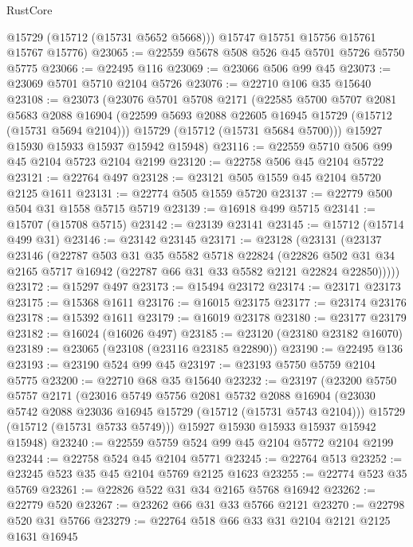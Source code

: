 \begin{lexlean}{RustCore}
\begin{coremodule}
        @15729
        (@15712 (@15731 @5652 @5668)))
      @15747
      @15751
      @15756
      @15761
      @15767
      @15776)
@23065 := @22559 @5678 @508 @526 @45 @5701 @5726 @5750 @5775
@23066 := @22495 @116
@23069 := @23066 @506 @99 @45
@23073 := @23069 @5701 @5710 @2104 @5726
@23076 := @22710 @106 @35 @15640
@23108 := @23073
    (@23076
      @5701
      @5708
      @2171
      (@22585
        @5700
        @5707
        @2081
        @5683
        @2088
        @16904
        (@22599 @5693 @2088 @22605 @16945 @15729 (@15712 (@15731 @5694 @2104)))
        @15729
        (@15712 (@15731 @5684 @5700)))
      @15927
      @15930
      @15933
      @15937
      @15942
      @15948)
@23116 := @22559 @5710 @506 @99 @45 @2104 @5723 @2104 @2199
@23120 := @22758 @506 @45 @2104 @5722
@23121 := @22764 @497
@23128 := @23121 @505 @1559 @45 @2104 @5720 @2125 @1611
@23131 := @22774 @505 @1559 @5720
@23137 := @22779 @500 @504 @31 @1558 @5715 @5719
@23139 := @16918 @499 @5715
@23141 := @15707 (@15708 @5715)
@23142 := @23139 @23141
@23145 := @15712 (@15714 @499 @31)
@23146 := @23142 @23145
@23171 := @23128
    (@23131
      (@23137
        @23146
        (@22787
          @503
          @31
          @35
          @5582
          @5718
          @22824
          (@22826 @502 @31 @34 @2165 @5717 @16942 (@22787 @66 @31 @33 @5582 @2121 @22824 @22850)))))
@23172 := @15297 @497
@23173 := @15494 @23172
@23174 := @23171 @23173
@23175 := @15368 @1611
@23176 := @16015 @23175
@23177 := @23174 @23176
@23178 := @15392 @1611
@23179 := @16019 @23178
@23180 := @23177 @23179
@23182 := @16024 (@16026 @497)
@23185 := @23120 (@23180 @23182 @16070)
@23189 := @23065 (@23108 (@23116 @23185 @22890))
@23190 := @22495 @136
@23193 := @23190 @524 @99 @45
@23197 := @23193 @5750 @5759 @2104 @5775
@23200 := @22710 @68 @35 @15640
@23232 := @23197
    (@23200
      @5750
      @5757
      @2171
      (@23016
        @5749
        @5756
        @2081
        @5732
        @2088
        @16904
        (@23030 @5742 @2088 @23036 @16945 @15729 (@15712 (@15731 @5743 @2104)))
        @15729
        (@15712 (@15731 @5733 @5749)))
      @15927
      @15930
      @15933
      @15937
      @15942
      @15948)
@23240 := @22559 @5759 @524 @99 @45 @2104 @5772 @2104 @2199
@23244 := @22758 @524 @45 @2104 @5771
@23245 := @22764 @513
@23252 := @23245 @523 @35 @45 @2104 @5769 @2125 @1623
@23255 := @22774 @523 @35 @5769
@23261 := @22826 @522 @31 @34 @2165 @5768 @16942
@23262 := @22779 @520
@23267 := @23262 @66 @31 @33 @5766 @2121
@23270 := @22798 @520 @31 @5766
@23279 := @22764 @518 @66 @33 @31 @2104 @2121 @2125 @1631 @16945

\end{coremodule}
\end{lexlean}
